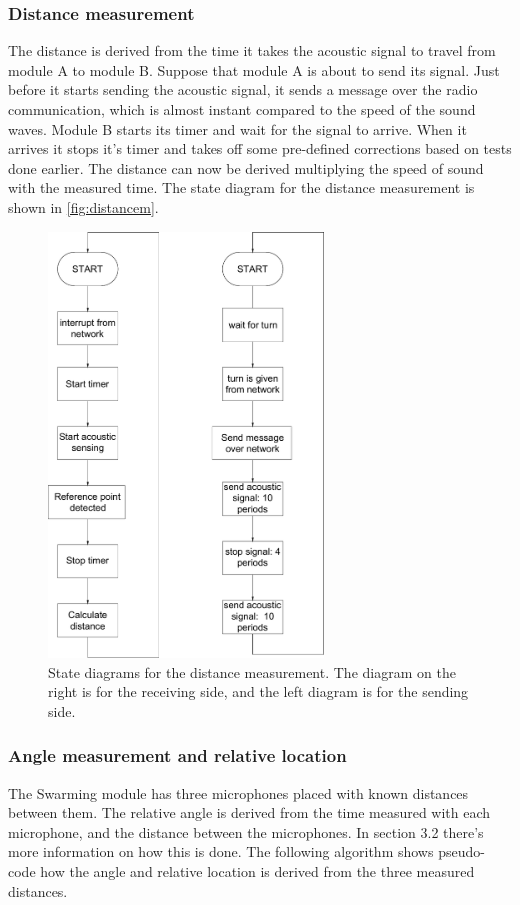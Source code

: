 \documentclass[10pt,a4paper]{article}
\begin{document}
\subsubsection{Distance measurement}
The distance is derived from the time it takes the acoustic signal to travel from module A to module B. 
Suppose that module A is about to send its signal. Just before it starts sending the acoustic signal, it sends a message over the radio communication, which is almost instant compared to the speed of the sound waves. Module B starts its timer and wait for the signal to arrive. When it arrives it stops it's timer and takes off some pre-defined corrections based on tests done earlier. The distance can now be derived multiplying the speed of sound with the measured time. The state diagram for the distance measurement is shown in \ref{fig:distancem}.

\begin{figure}[H]
    \centering
    \includegraphics[width=0.65\textwidth]{distancem.pdf}
    \caption{State diagrams for the distance measurement. The diagram on the right is for the receiving side, and the left diagram is for the sending side.}
    \label{fig:distancemk}
\end{figure}



\subsubsection{Angle measurement and relative location}
The Swarming module has three microphones placed with known distances between them. The relative angle is derived from the time measured with each microphone, and the distance between the microphones. In section 3.2 there's more information on how this is done. The following algorithm shows pseudo-code how the angle and relative location is derived from the three measured distances.

\end{document}
